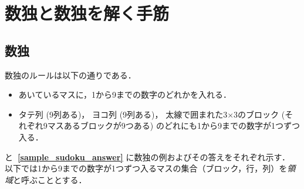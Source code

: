 \documentclass[submit,techrep,noauthor]{ipsj}
\begin{document}
\section{数独と数独を解く手筋}

\subsection{数独}
数独のルールは以下の通りである\cite{sudoku58:online}．
	\begin{itemize}
	\item あいているマスに，1から9までの数字のどれかを入れる．
	\item タテ列 (9列ある)， ヨコ列 (9列ある)， 太線で囲まれた3×3のブロック (それぞれ9マスあるブロックが9つある) のどれにも1から9までの数字が1つずつ入る．
	\end{itemize}
 と\textbf{~\ref{sample_sudoku_answer}} に数独の例およびその答えをそれぞれ示す．
以下では1から9までの数字が1つずつ入るマスの集合（ブロック，行，列）を\emph{領域}と呼ぶこととする．
\end{document}
